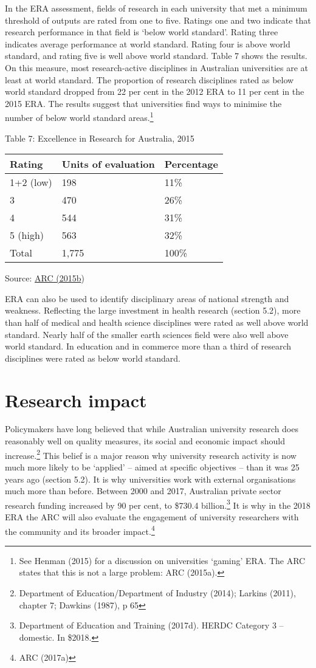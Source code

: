 \documentclass[]{book}
\begin{document}
In the ERA assessment, fields of research in each university that met a minimum threshold of outputs are rated from one to five. Ratings one and two indicate that research performance in that field is `below world standard'. Rating three indicates average performance at world standard. Rating four is above world standard, and rating five is well above world standard. Table 7 shows the results. On this measure, most research-active disciplines in Australian universities are at least at world standard. The proportion of research disciplines rated as below world standard dropped from 22 per cent in the 2012 ERA to 11 per cent in the 2015 ERA. The results suggest that universities find ways to minimise the number of below world standard areas.\footnote{See Henman (2015) for a discussion on universities `gaming' ERA. The ARC states that this is not a large problem: ARC (2015a).}

\protect\hypertarget{_Ref343504338}{}{}Table 7: Excellence in Research for Australia, 2015

\begin{longtable}[]{@{}lll@{}}
\toprule
\textbf{Rating} & \textbf{Units of evaluation} & \textbf{Percentage}\tabularnewline
\midrule
\endhead
1+2 (low) & 198 & 11\%\tabularnewline
3 & 470 & 26\%\tabularnewline
4 & 544 & 31\%\tabularnewline
5 (high) & 563 & 32\%\tabularnewline
Total & 1,775 & 100\%\tabularnewline
\bottomrule
\end{longtable}

Source: \protect\hyperlink{_ENREF_22}{ARC (2015b})

ERA can also be used to identify disciplinary areas of national strength and weakness. Reflecting the large investment in health research (section 5.2), more than half of medical and health science disciplines were rated as well above world standard. Nearly half of the smaller earth sciences field were also well above world standard. In education and in commerce more than a third of research disciplines were rated as below world standard.

\hypertarget{research-impact}{%
\section{Research impact }\label{research-impact}}

Policymakers have long believed that while Australian university research does reasonably well on quality measures, its social and economic impact should increase.\footnote{Department of Education/Department of Industry (2014); Larkins (2011), chapter 7; Dawkins (1987), p 65} This belief is a major reason why university research activity is now much more likely to be `applied' -- aimed at specific objectives -- than it was 25 years ago (section 5.2). It is why universities work with external organisations much more than before. Between 2000 and 2017, Australian private sector research funding increased by 90 per cent, to \$730.4 billion.\footnote{Department of Education and Training (2017d). HERDC Category 3 -- domestic. In \$2018.} It is why in the 2018 ERA the ARC will also evaluate the engagement of university researchers with the community and its broader impact.\footnote{ARC (2017a)}
\end{document}
